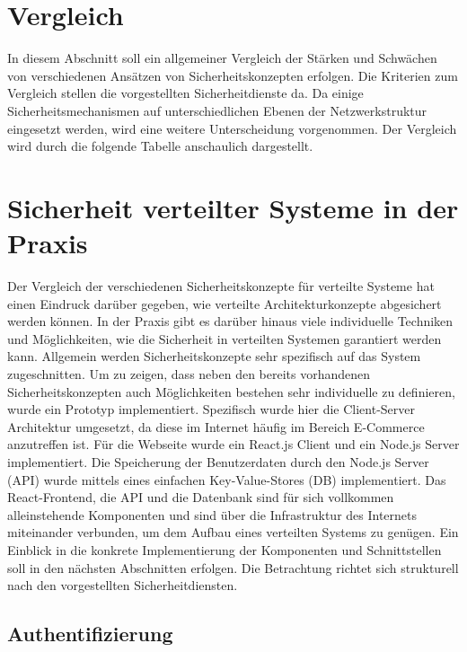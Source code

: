 \documentclass[utf8,biblatex]{lni}
\begin{document}
\section{Vergleich}

In diesem Abschnitt soll ein allgemeiner Vergleich der 
Stärken und Schwächen von verschiedenen Ansätzen von Sicherheitskonzepten erfolgen. 
Die Kriterien zum Vergleich stellen die vorgestellten Sicherheitdienste da. 
Da einige Sicherheitsmechanismen auf unterschiedlichen Ebenen der Netzwerkstruktur eingesetzt werden, 
wird eine weitere Unterscheidung vorgenommen.
Der Vergleich wird durch die folgende Tabelle anschaulich dargestellt.



\section{Sicherheit verteilter Systeme in der Praxis}

Der Vergleich der verschiedenen Sicherheitskonzepte für verteilte Systeme hat einen Eindruck darüber gegeben, wie 
verteilte Architekturkonzepte abgesichert werden können. In der Praxis gibt es darüber hinaus viele individuelle Techniken und Möglichkeiten, wie die Sicherheit in verteilten Systemen 
garantiert werden kann. Allgemein werden Sicherheitskonzepte sehr spezifisch auf das System zugeschnitten.
Um zu zeigen, dass neben den bereits vorhandenen Sicherheitskonzepten auch Möglichkeiten bestehen sehr individuelle zu definieren, wurde ein Prototyp implementiert.
Spezifisch wurde hier die Client-Server Architektur umgesetzt, da diese im Internet häufig im Bereich E-Commerce anzutreffen ist.
Für die Webseite wurde ein React.js Client und ein Node.js Server implementiert. 
Die Speicherung der Benutzerdaten durch den Node.js Server (API) wurde mittels eines einfachen Key-Value-Stores (DB) implementiert. 
Das React-Frontend, die API und die Datenbank sind für sich vollkommen alleinstehende Komponenten und sind über die Infrastruktur 
des Internets miteinander verbunden, um dem Aufbau eines verteilten Systems zu genügen.
Ein Einblick in die konkrete Implementierung der Komponenten und Schnittstellen soll in den nächsten Abschnitten erfolgen. 
Die Betrachtung richtet sich strukturell nach den vorgestellten Sicherheitdiensten.

\subsection{Authentifizierung}
\end{document}
